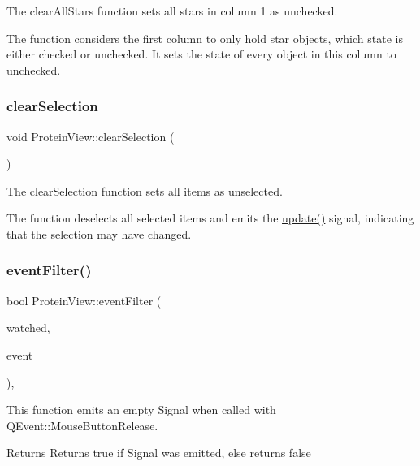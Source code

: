 The clear\+All\+Stars function sets all stars in column 1 as unchecked. 

The function considers the first column to only hold star objects, which state is either checked or unchecked. It sets the state of every object in this column to unchecked. \mbox{\label{class_protein_view_ae025e7252521425bff32a5656877add0}} 
\subsubsection{\texorpdfstring{clear\+Selection}{clearSelection}}
{\footnotesize\ttfamily void Protein\+View\+::clear\+Selection (\begin{DoxyParamCaption}{ }\end{DoxyParamCaption})\hspace{0.3cm}{\ttfamily [slot]}}



The clear\+Selection function sets all items as unselected. 

The function deselects all selected items and emits the \mbox{\hyperlink{class_protein_view_a373eab90a586e782397fb033ab052cc1}{update()}} signal, indicating that the selection may have changed. \mbox{\label{class_protein_view_ad6a88c7d11cfd0fef51f5e3da4cf3476}} 
\subsubsection{\texorpdfstring{event\+Filter()}{eventFilter()}}
{\footnotesize\ttfamily bool Protein\+View\+::event\+Filter (\begin{DoxyParamCaption}\item[{Q\+Object $\ast$}]{watched,  }\item[{Q\+Event $\ast$}]{event }\end{DoxyParamCaption})\hspace{0.3cm}{\ttfamily [override]}, {\ttfamily [protected]}}



This function emits an empty Signal when called with Q\+Event\+::\+Mouse\+Button\+Release. 

\begin{DoxyReturn}{Returns}
Returns true if Signal was emitted, else returns false 
\end{DoxyReturn}
\mbox{\label{class_protein_view_af352ac170651ea7d1ed401200a14c2c8}} 
